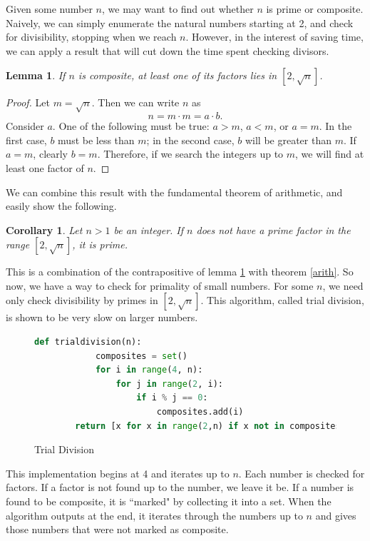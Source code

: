 \documentclass{amsart}
\newtheorem{lem}{Lemma}
\newtheorem{cor}{Corollary}
\theoremstyle{definition}
\theoremstyle{case}
\begin{document}
	Given some number $n$, we may want to find out whether $n$ is prime or composite. Naively, we can simply enumerate the natural numbers starting at 2, and check for divisibility, stopping when we reach $n$. However, in the interest of saving time, we can apply a result that will cut down the time spent checking divisors.
	\begin{lem}\label{sqrt}
		If $n$ is composite, at least one of its factors lies in $[2, \sqrt{n}]$.
	\end{lem}
	\begin{proof}
		Let $m = \sqrt{n}$. Then we can write $n$ as
		$$ n = m \cdot m = a \cdot b . $$
		Consider $a$. One of the following must be true: $a>m$, $a<m$, or $a=m$. In the first case, $b$ must be less than $m$; in the second case, $b$ will be greater than $m$. If $a=m$, clearly $b=m$. Therefore, if we search the integers up to $m$, we will find at least one factor of $n$.
	\end{proof}
	
	We can combine this result with the fundamental theorem of arithmetic, and easily show the following.
	\begin{cor}\label{corprime}
		Let $n>1$ be an integer. If $n$ does not have a prime factor in the range $[2, \sqrt{n}]$, it is prime.
	\end{cor}
	This is a combination of the contrapositive of lemma \ref{sqrt} with theorem \ref{arith}. So now, we have a way to check for primality of small numbers. For some $n$, we need only check divisibility by primes in $[2, \sqrt{n}]$. This algorithm, called trial division, is shown to be very slow on larger numbers.
	
	\begin{figure}[H]\caption{Trial Division}
		\begin{lstlisting}[language=Python]
		def trialdivision(n):
		    composites = set()
		    for i in range(4, n):
		        for j in range(2, i):
		            if i % j == 0:
		                composites.add(i)
		return [x for x in range(2,n) if x not in composites]
		\end{lstlisting}
	\end{figure}
	
	This implementation begins at 4 and iterates up to $n$. Each number is checked for factors. If a factor is not found up to the number, we leave it be. If a number is found to be composite, it is ``marked" by collecting it into a set. When the algorithm outputs at the end, it iterates through the numbers up to $n$ and gives those numbers that were not marked as composite.
	
\end{document}
